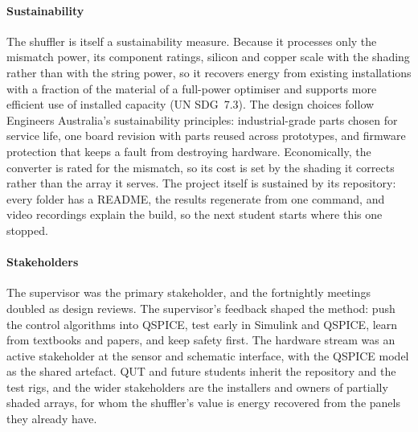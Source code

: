 \paragraph{Sustainability}
The shuffler is itself a sustainability measure. Because it processes only the mismatch power, its component ratings, silicon and copper scale with the shading rather than with the string power, so it recovers energy from existing installations with a fraction of the material of a full-power optimiser and supports more efficient use of installed capacity (UN SDG~7.3). The design choices follow Engineers Australia's sustainability principles: industrial-grade parts chosen for service life, one board revision with parts reused across prototypes, and firmware protection that keeps a fault from destroying hardware. Economically, the converter is rated for the mismatch, so its cost is set by the shading it corrects rather than the array it serves. The project itself is sustained by its repository: every folder has a README, the results regenerate from one command, and video recordings explain the build, so the next student starts where this one stopped.

\paragraph{Stakeholders}
The supervisor was the primary stakeholder, and the fortnightly meetings doubled as design reviews. The supervisor's feedback shaped the method: push the control algorithms into QSPICE, test early in Simulink and QSPICE, learn from textbooks and papers, and keep safety first. The hardware stream was an active stakeholder at the sensor and schematic interface, with the QSPICE model as the shared artefact. QUT and future students inherit the repository and the test rigs, and the wider stakeholders are the installers and owners of partially shaded arrays, for whom the shuffler's value is energy recovered from the panels they already have.
